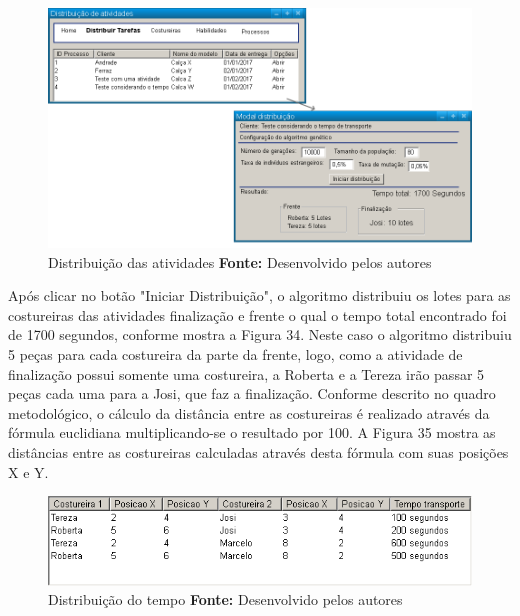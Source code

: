 \begin{figure}[h!]
	\centerline{\includegraphics[scale=0.3]{./imagens/test_case2_distribuicao.png}}
	\caption[Distribuição das atividades]
	{Distribuição das atividades \textbf{Fonte:} Desenvolvido pelos autores}
	\label{fig:exemplo1}
\end{figure}

\par Após clicar no botão "Iniciar Distribuição", o algoritmo distribuiu os lotes para as costureiras das atividades
 finalização e frente o qual o tempo total encontrado foi de 1700 segundos,
 conforme mostra a Figura 34. Neste caso o algoritmo distribuiu 5 peças para cada costureira da parte da frente, logo, como a atividade de finalização possui somente uma costureira,
 a Roberta e a Tereza irão passar 5 peças cada uma para a Josi, que faz a
 finalização. Conforme descrito no quadro metodológico, o cálculo da distância entre as costureiras é realizado através da fórmula euclidiana multiplicando-se o resultado por 100.
 A Figura 35 mostra as distâncias entre as costureiras calculadas através desta
 fórmula com suas posições X e Y.
  
  \newpage
  
  \begin{figure}[h!]
  	\centerline{\includegraphics[scale=0.7]{./imagens/test_case_2_tempo_distribuicao.png}}
  	\caption[Distribuição do tempo]
  	{Distribuição do tempo  \textbf{Fonte:} Desenvolvido pelos autores}
  	\label{fig:exemplo1}
  \end{figure}
 
